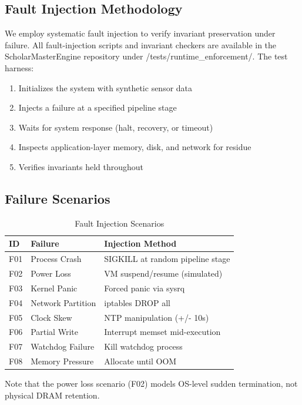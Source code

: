 \documentclass[conference]{IEEEtran}
\begin{document}
\subsection{Fault Injection Methodology}
We employ systematic fault injection to verify invariant preservation under failure. All fault-injection scripts and invariant checkers are available in the ScholarMasterEngine repository under /tests/runtime\_enforcement/. The test harness:
\begin{enumerate}
    \item Initializes the system with synthetic sensor data
    \item Injects a failure at a specified pipeline stage
    \item Waits for system response (halt, recovery, or timeout)
    \item Inspects application-layer memory, disk, and network for residue
    \item Verifies invariants held throughout
\end{enumerate}

\subsection{Failure Scenarios}

\begin{table}[htbp]
\caption{Fault Injection Scenarios}
\centering
\begin{tabular}{@{}lp{2.2cm}p{4.2cm}@{}}
\toprule
\textbf{ID} & \textbf{Failure} & \textbf{Injection Method} \\
\midrule
F01 & Process Crash & SIGKILL at random pipeline stage \\
F02 & Power Loss & VM suspend/resume (simulated) \\
F03 & Kernel Panic & Forced panic via sysrq \\
F04 & Network Partition & iptables DROP all \\
F05 & Clock Skew & NTP manipulation (+/- 10s) \\
F06 & Partial Write & Interrupt memset mid-execution \\
F07 & Watchdog Failure & Kill watchdog process \\
F08 & Memory Pressure & Allocate until OOM \\
\bottomrule
\end{tabular}
\label{tab:injection}
\end{table}

Note that the power loss scenario (F02) models OS-level sudden termination, not physical DRAM retention.
\end{document}
